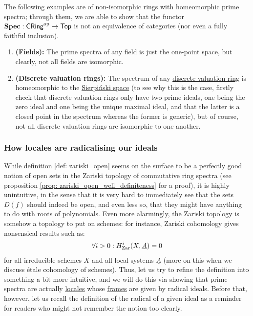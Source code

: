                 \begin{example} \label{example: nonisomorphic_rings_with_the_same_spectra}
                    The following examples are of non-isomorphic rings with homeomorphic prime spectra; through them, we are able to show that the functor $\mathbf{Spec}: \mathsf{CRing}^{\mathrm{op}} \to \mathsf{Top}$ is not an equivalence of categories (nor even a fully faithful inclusion). 
                    \begin{enumerate}
                        \item \textbf{(Fields):} The prime spectra of any field is just the one-point space, but clearly, not all fields are isomorphic.
                        \item \textbf{(Discrete valuation rings):} The spectrum of any \href{https://en.wikipedia.org/wiki/Discrete_valuation_ring}{\underline{discrete valuation ring}} is homeomorphic to the \href{https://ncatlab.org/nlab/show/Sierpinski+space}{\underline{Sierpi\'nski space}} (to see why this is the case, firstly check that discrete valuation rings only have two prime ideals, one being the zero ideal and one being the unique maximal ideal, and that the latter is a closed point in the spectrum whereas the former is generic), but of course, not all discrete valuation rings are isomorphic to one another.
                    \end{enumerate}
                \end{example}
                
            \subsubsection{How locales are radicalising our ideals} 
                \begin{remark}
                    While definition \ref{def: zariski_open} seems on the surface to be a perfectly good notion of open sets in the Zariski topology of commutative ring spectra (see proposition \ref{prop: zariski_open_well_definiteness} for a proof), it is highly unintuitive, in the sense that it is very hard to immediately see that the sets $D(f)$ should indeed be open, and even less so, that they might have anything to do with roots of polynomials. Even more alarmingly, the Zariski topology is somehow a  topology to put on schemes: for instance, Zariski cohomology gives nonsensical results such as:
                        $$\forall i > 0: H_{\mathrm{Zar}}^i(X, \underline{A}) = 0$$
                    for all irreducible schemes $X$ and all local systems $\underline{A}$ (more on this when we discuss \'etale cohomology of schemes). Thus, let us try to refine the definition into something a bit more intuitive, and we will do this via showing that prime spectra are actually \href{https://ncatlab.org/nlab/show/locale}{\underline{locales}} whose \href{https://ncatlab.org/nlab/show/frame}{\underline{frames}} are given by radical ideals. Before that, however, let us recall the definition of the radical of a given ideal as a reminder for readers who might not remember the notion too clearly. 
                \end{remark}
                
